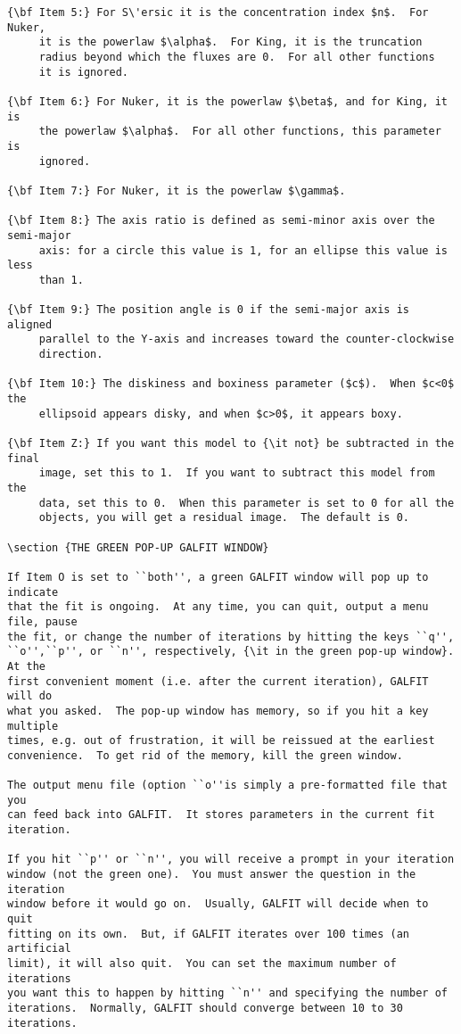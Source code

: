 \documentclass[preprint]{aastex}
\begin{document}
\begin {verbatim}
{\bf Item 5:} For S\'ersic it is the concentration index $n$.  For Nuker,
	 it is the powerlaw $\alpha$.  For King, it is the truncation
	 radius beyond which the fluxes are 0.  For all other functions
	 it is ignored.

{\bf Item 6:} For Nuker, it is the powerlaw $\beta$, and for King, it is
	 the powerlaw $\alpha$.  For all other functions, this parameter is
	 ignored.

{\bf Item 7:} For Nuker, it is the powerlaw $\gamma$.

{\bf Item 8:} The axis ratio is defined as semi-minor axis over the semi-major
	 axis: for a circle this value is 1, for an ellipse this value is less
	 than 1.

{\bf Item 9:} The position angle is 0 if the semi-major axis is aligned
	 parallel to the Y-axis and increases toward the counter-clockwise
	 direction.

{\bf Item 10:} The diskiness and boxiness parameter ($c$).  When $c<0$ the
	 ellipsoid appears disky, and when $c>0$, it appears boxy.

{\bf Item Z:} If you want this model to {\it not} be subtracted in the final
	 image, set this to 1.  If you want to subtract this model from the
	 data, set this to 0.  When this parameter is set to 0 for all the
	 objects, you will get a residual image.  The default is 0.

\section {THE GREEN POP-UP GALFIT WINDOW}

If Item O is set to ``both'', a green GALFIT window will pop up to indicate
that the fit is ongoing.  At any time, you can quit, output a menu file, pause
the fit, or change the number of iterations by hitting the keys ``q'',
``o'',``p'', or ``n'', respectively, {\it in the green pop-up window}.  At the
first convenient moment (i.e. after the current iteration), GALFIT will do
what you asked.  The pop-up window has memory, so if you hit a key multiple
times, e.g. out of frustration, it will be reissued at the earliest
convenience.  To get rid of the memory, kill the green window.

The output menu file (option ``o''is simply a pre-formatted file that you 
can feed back into GALFIT.  It stores parameters in the current fit iteration.

If you hit ``p'' or ``n'', you will receive a prompt in your iteration
window (not the green one).  You must answer the question in the iteration
window before it would go on.  Usually, GALFIT will decide when to quit
fitting on its own.  But, if GALFIT iterates over 100 times (an artificial
limit), it will also quit.  You can set the maximum number of iterations
you want this to happen by hitting ``n'' and specifying the number of
iterations.  Normally, GALFIT should converge between 10 to 30 iterations.


\end{verbatim}
\end{document}
